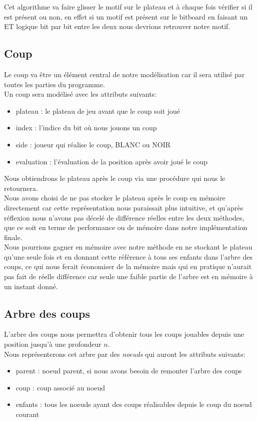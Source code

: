 \documentclass{article}
\begin{document}
Cet algorithme va faire glisser le motif sur le plateau et à chaque fois vérifier si il est présent ou non, en effet
si un motif est présent sur le bitboard en faisant un ET logique bit par bit entre les deux nous devrions retrouver
notre motif.

\pagebreak
\subsection{Coup}

Le coup va être un élément central de notre modélisation car il sera utilisé par toutes les parties du programme.\\
Un coup sera modélisé avec les attributs suivants:
\begin{itemize}
\item plateau : le plateau de jeu avant que le coup soit joué
\item index : l'indice du bit où nous jouons un coup
\item side : joueur qui réalise le coup, BLANC ou NOIR
\item evaluation : l'évaluation de la position après avoir joué le coup\\
\end{itemize}

Nous obtiendrons le plateau après le coup via une procédure qui nous le retournera.\\
Nous avons choisi de ne pas stocker le plateau après le coup en mémoire directement car cette représentation
nous paraissait plus intuitive, et qu'après réflexion nous n'avons pas décelé de différence réelles entre les deux
méthodes, que ce soit en terme de performance ou de mémoire dans notre implémentation finale.\\

Nous pourrions gagner en mémoire avec notre méthode en ne stockant le plateau qu'une seule fois et en donnant cette référence
à tous ses enfants dans l'arbre des coups, ce qui nous ferait économiser de la mémoire mais qui en pratique n'aurait pas fait 
de réelle différence car seule une faible partie de l'arbre est en mémoire à un instant donné.

\subsection{Arbre des coups}

L'arbre des coups nous permettra d'obtenir tous les coups jouables depuis une position jusqu'à une profondeur $n$.\\
Nous représenterons cet arbre par des \textit{noeuds} qui auront les attributs suivants:
\begin{itemize}
\item parent : noeud parent, si nous avons besoin de remonter l'arbre des coups
\item coup : coup associé au noeud
\item enfants : tous les noeuds ayant des coups réalisables depuis le coup du noeud courant \\
\end{itemize}
\end{document}

